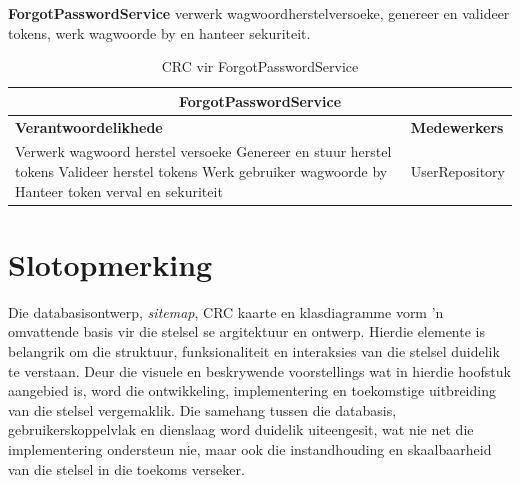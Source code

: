 \vspace{1em}
\textbf{ForgotPasswordService} verwerk wagwoordherstelversoeke, genereer en valideer tokens, werk wagwoorde by en hanteer sekuriteit.
\begin{table}[H]\centering\begin{tabular}{|p{}|p{}|}
    \hline
    \multicolumn{2}{|c|}{\textbf{ForgotPasswordService}} \\
    \hline
    \textbf{Verantwoordelikhede} & \textbf{Medewerkers} \\
    \hline
    Verwerk wagwoord herstel versoeke \newline
    Genereer en stuur herstel tokens \newline
    Valideer herstel tokens \newline
    Werk gebruiker wagwoorde by \newline
    Hanteer token verval en sekuriteit
    &
    UserRepository \\
    \hline
\end{tabular}
\caption{CRC vir ForgotPasswordService}
\label{tab:crc_forgot_password_service}
\end{table}

\section{Slotopmerking}
Die databasisontwerp, \textit{sitemap}, \ac{CRC} kaarte en klasdiagramme vorm 'n
omvattende basis vir die stelsel se argitektuur en ontwerp. Hierdie elemente is
belangrik om die struktuur, funksionaliteit en interaksies van die stelsel duidelik te verstaan. Deur die visuele en beskrywende voorstellings wat in hierdie hoofstuk aangebied is, word die ontwikkeling, implementering en toekomstige uitbreiding van die stelsel vergemaklik. Die samehang tussen die databasis, gebruikerskoppelvlak en dienslaag word duidelik uiteengesit, wat nie net die implementering ondersteun nie, maar ook die instandhouding en skaalbaarheid van die stelsel in die toekoms verseker.